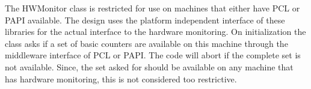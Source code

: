 %



The HWMonitor class is restricted for use on machines that either
have PCL or PAPI available. The design uses the platform independent
interface of these libraries for the actual interface to the hardware
monitoring. On initialization the class asks if a set of basic counters
are available on this machine through the middleware interface of PCL or 
PAPI. The code will abort if the complete set is not available. Since, the
set asked for should be available on any machine that has hardware monitoring,
this is not considered too restrictive.
